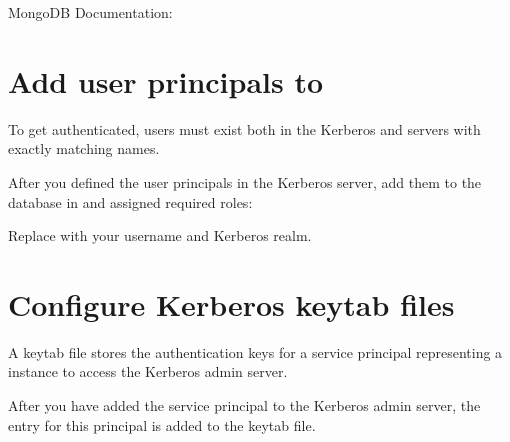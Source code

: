 \documentclass[letterpaper,10pt,english]{sphinxmanual}
\begin{document}
\nopagebreak


\sphinxAtStartPar
MongoDB Documentation: 




\section{Add user principals to }
\label{\detokenize{kerberos:add-user-principals-to-psmdb}}
\sphinxAtStartPar
To get authenticated, users must exist both in the Kerberos and  servers with exactly matching names.

\sphinxAtStartPar
After you defined the user principals in the Kerberos server, add them to the  database in  and assigned required roles:

\begin{sphinxVerbatim}[commandchars=\\\{\}]
\PYG{p}{[}\PYG{p}{]}
\end{sphinxVerbatim}

\sphinxAtStartPar
Replace  with your username and Kerberos realm.


\section{Configure Kerberos keytab files}
\label{\detokenize{kerberos:configure-kerberos-keytab-files}}
\sphinxAtStartPar
A keytab file stores the authentication keys for a service principal representing a  instance to access the Kerberos admin server.

\sphinxAtStartPar
After you have added the service principal to the Kerberos admin server, the entry for this principal is added to the  keytab file.
\end{document}
